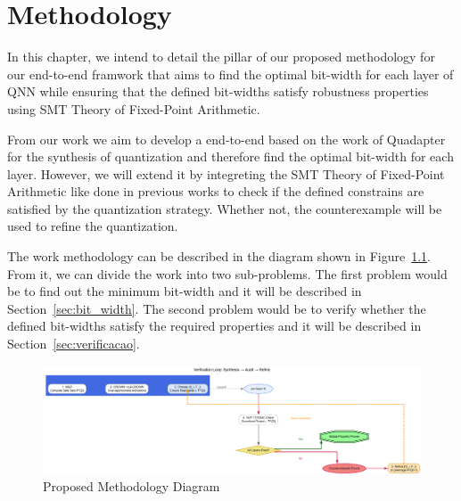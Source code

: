 \chapter{Methodology} \label{chap:metodologia}

In this chapter, we intend to detail the pillar of our proposed methodology for our end-to-end framwork that aims to find the optimal bit-width for each layer of QNN while ensuring that the defined bit-widths satisfy robustness properties using SMT Theory of Fixed-Point Arithmetic.

From our work we aim to develop a end-to-end based on the work of Quadapter \cite{cai2025certified} for the synthesis of quantization and therefore find the optimal bit-width for each layer. However, we will extend it by integreting the SMT Theory of Fixed-Point Arithmetic like done in previous works \cite{baranowski2020smt, sena2021verifying, zhang2020qvip, huangEfficientVerificationQuantized2023, henzingerScalableVerificationQuantized2022} to check if the defined constrains are satisfied by the quantization strategy. Whether not, the counterexample will be used to refine the quantization.

The work methodology can be described in the diagram shown in Figure~\ref{fig:diagrama_metodologia}. From it, we can divide the work into two sub-problems. The first problem would be to find out the minimum bit-width and it will be described in Section~\ref{sec:bit_width}. The second problem would be to verify whether the defined bit-widths satisfy the required properties and it will be described in Section~\ref{sec:verificacao}.  

\begin{figure}[H]
    \centering
    \includegraphics[width=1\textwidth]{figuras/3-metodologia/flowDiagram.png}
    \caption{Proposed Methodology Diagram}
    \label{fig:diagrama_metodologia}
\end{figure}


